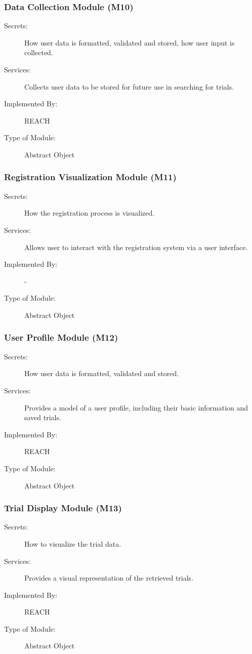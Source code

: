\documentclass[12pt, titlepage]{article}
\begin{document}
\subsubsection{Data Collection Module (M10)}
\begin{description}
\item[Secrets:] How user data is formatted, validated and stored, how user input is collected.
\item[Services:] Collects user data to be stored for future use in searching for trials.
\item[Implemented By:] REACH
\item[Type of Module:] Abstract Object \\
\end{description}

\subsubsection{Registration Visualization Module (M11)}
\begin{description}
\item[Secrets:] How the registration process is visualized.
\item[Services:] Allows user to interact with the registration system via a user interface.
\item[Implemented By:] -
\item[Type of Module:] Abstract Object \\
\end{description}

\subsubsection{User Profile Module (M12)}
\begin{description}
\item[Secrets:] How user data is formatted, validated and stored.
\item[Services:] Provides a model of a user profile, including their basic information and saved trials.
\item[Implemented By:] REACH
\item[Type of Module:] Abstract Object \\
\end{description}

\subsubsection{Trial Display Module (M13)}
\begin{description}
\item[Secrets:] How to visualize the trial data.
\item[Services:] Provides a visual representation of the retrieved trials.
\item[Implemented By:] REACH
\item[Type of Module:]  Abstract Object \\
\end{description}
\end{document}
